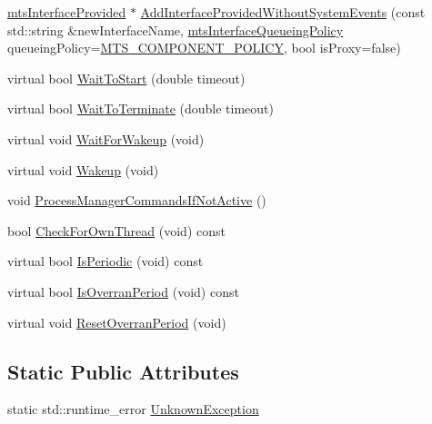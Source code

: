 \begin{DoxyCompactItemize}
\item 
\hyperlink{classmts_interface_provided}{mts\-Interface\-Provided} $\ast$ \hyperlink{classmts_task_a285ac2354e954ed0f3f8213590eff19c}{Add\-Interface\-Provided\-Without\-System\-Events} (const std\-::string \&new\-Interface\-Name, \hyperlink{mts_forward_declarations_8h_abedfb5c45b329a89b0fb647a96a7c938}{mts\-Interface\-Queueing\-Policy} queueing\-Policy=\hyperlink{mts_forward_declarations_8h_abedfb5c45b329a89b0fb647a96a7c938aff70a768b1fb65f10206583efbad12bb}{M\-T\-S\-\_\-\-C\-O\-M\-P\-O\-N\-E\-N\-T\-\_\-\-P\-O\-L\-I\-C\-Y}, bool is\-Proxy=false)
\item 
virtual bool \hyperlink{classmts_task_aeb6270faa5d0c00740677c510e7031a4}{Wait\-To\-Start} (double timeout)
\item 
virtual bool \hyperlink{classmts_task_ad0b31e1f08f2ce351eb5f71e80ccda27}{Wait\-To\-Terminate} (double timeout)
\item 
virtual void \hyperlink{classmts_task_ab99ef3c0d368d3f2a35c5fad7a035471}{Wait\-For\-Wakeup} (void)
\item 
virtual void \hyperlink{classmts_task_a4cb52c04023a0cc729a92eceefa268f7}{Wakeup} (void)
\item 
void \hyperlink{classmts_task_aa8f23b499eb009b20055b54df343fb37}{Process\-Manager\-Commands\-If\-Not\-Active} ()
\item 
bool \hyperlink{classmts_task_a6cd434e821df3f460832856c8d15bf2f}{Check\-For\-Own\-Thread} (void) const 
\item 
virtual bool \hyperlink{classmts_task_ae6568e446bb341b862bb2748be221c85}{Is\-Periodic} (void) const 
\item 
virtual bool \hyperlink{classmts_task_a09580b446a82b6ecdd14f6e5d2b5da96}{Is\-Overran\-Period} (void) const 
\item 
virtual void \hyperlink{classmts_task_a317c88555ccdb5a70af2cba2d9070c8d}{Reset\-Overran\-Period} (void)
\end{DoxyCompactItemize}
\subsection*{Static Public Attributes}
\begin{DoxyCompactItemize}
\item 
static std\-::runtime\-\_\-error \hyperlink{classmts_task_a518652604363d9402292a67c1836e888}{Unknown\-Exception}
\end{DoxyCompactItemize}
